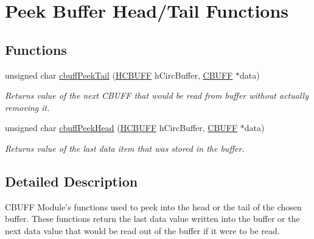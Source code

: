 \hypertarget{group___c_b_u_f_fpeek_buffer_functions}{
\section{Peek Buffer Head/Tail Functions}
\label{group___c_b_u_f_fpeek_buffer_functions}
}
\subsection*{Functions}
\begin{DoxyCompactItemize}
\item 
unsigned char \hyperlink{group___c_b_u_f_fpeek_buffer_functions_ga4b431b4317e2f75b549b062530ecd9a3}{cbuffPeekTail} (\hyperlink{group___c_b_u_f_fdata_types_ga554880d758aa53ae40930fbb49412e60}{HCBUFF} hCircBuffer, \hyperlink{group___c_b_u_f_fdata_types_ga4c6278cce108e0ee8bb1b9c609d0cbf4}{CBUFF} $\ast$data)
\begin{DoxyCompactList}\small\item\em Returns value of the next CBUFF that would be read from buffer without actually removing it. \item\end{DoxyCompactList}\item 
unsigned char \hyperlink{group___c_b_u_f_fpeek_buffer_functions_ga52d817b014ba86d30009afd4197392bf}{cbuffPeekHead} (\hyperlink{group___c_b_u_f_fdata_types_ga554880d758aa53ae40930fbb49412e60}{HCBUFF} hCircBuffer, \hyperlink{group___c_b_u_f_fdata_types_ga4c6278cce108e0ee8bb1b9c609d0cbf4}{CBUFF} $\ast$data)
\begin{DoxyCompactList}\small\item\em Returns value of the last data item that was stored in the buffer. \item\end{DoxyCompactList}\end{DoxyCompactItemize}


\subsection{Detailed Description}
CBUFF Module's functions used to peek into the head or the tail of the chosen buffer. These functions return the last data value written into the buffer or the next data value that would be read out of the buffer if it were to be read. 

